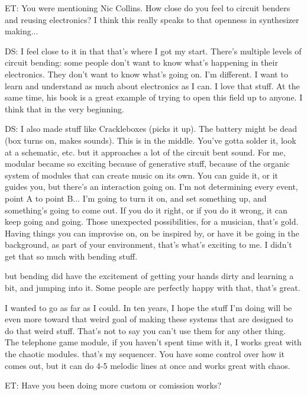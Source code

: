 ET: You were mentioning Nic Collins. How close do you feel to circuit benders and reusing electronics? I think this really speaks to that openness in synthesizer making...

DS: I feel close to it in that that's where I got my start. There's multiple levels of circuit bending: some people don't want to know what's happening in their electronics. They don't want to know what's going on. I'm different. I want to learn and understand as much about electronics as I can. I love that stuff. At the same time, his book is a great example of trying to open this field up to anyone. I think that in the very beginning.  

DS: I also made stuff like Crackleboxes (picks it up). The battery might be dead (box turns on, makes sounds). This is in the middle. You've gotta solder it, look at a schematic, etc. but it approaches a lot of the circuit bent sound. For me, modular became so exciting because of generative stuff, because of the organic system of modules that can create music on its own. You can guide it, or it guides you, but there's an interaction going on. I'm not determining every event, point A to point B... I'm going to turn it on, and set something up, and something's going to come out. If you do it right, or if you do it wrong, it can keep going and going. Those unexpected possibilities, for a musician, that's gold. Having things you can improvise on, on be inspired by, or have it be going in the background, as part of your environment, that's what's exciting to me. I didn't get that so much with bending stuff. 

but bending did have the excitement of getting your hands dirty and learning a bit, and jumping into it. Some people are perfectly happy with that, that's great. 

I wanted to go as far as I could. In ten years, I hope the stuff I'm doing will be even more toward that weird goal of making these systems that are designed to do that weird stuff. That's not to say you can't use them for any other thing. The telephone game module, if you haven't spent time with it, I works great with the chaotic modules. that's my sequencer. You have some control over how it comes out, but it can do 4-5 melodic lines at once and works great with chaos. 

ET: Have you been doing more custom or comission works? 

